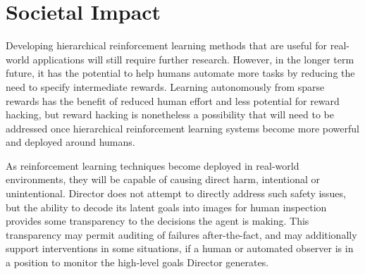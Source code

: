 \section*{Societal Impact}

Developing hierarchical reinforcement learning methods that are useful for real-world applications will still require further research.
However, in the longer term future, it has the potential to help humans automate more tasks by reducing the need to specify intermediate rewards. 
Learning autonomously from sparse rewards has the benefit of reduced human effort and less potential for reward hacking, but reward hacking is nonetheless a possibility that will need to be addressed once hierarchical reinforcement learning systems become more powerful and deployed around humans.

As reinforcement learning techniques become deployed in real-world environments, they will be capable of causing direct harm, intentional or unintentional.
Director does not attempt to directly address such safety issues, but the ability to decode its latent goals into images for human inspection provides some transparency to the decisions the agent is making.
This transparency may permit auditing of failures after-the-fact, and may additionally support interventions in some situations, if a human or automated observer is in a position to monitor the high-level goals Director generates.
